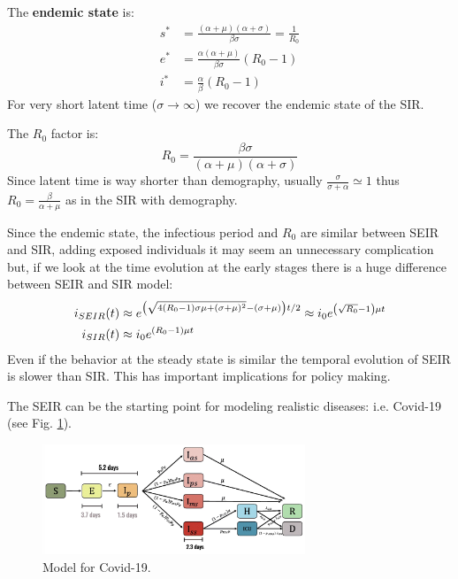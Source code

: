 \documentclass[../main/main.tex]{subfiles}
\begin{document}
The \textbf{endemic state} is:
\begin{equation}
\begin{split}
s^*  &=  \frac{(\alpha +\mu )(\alpha + \sigma )}{\beta \sigma } = \frac{1}{R_0} \\
e^* &= \frac{\alpha (\alpha +\mu )}{\beta \sigma } (R_0 -1)\\
i^* &= \frac{\alpha }{\beta } (R_0 -1)
\end{split}
\end{equation}
For very short latent time (\( \sigma \rightarrow \infty  \)) we recover the endemic state of the SIR.

The \( R_0 \) factor is:
\begin{equation}
  R_0 = \frac{\beta \sigma }{(\alpha + \mu )(\alpha +\sigma )}
\end{equation}
Since latent time is way shorter than demography, usually \( \frac{\sigma }{\sigma + \alpha } \simeq 1 \) thus \( R_0 = \frac{\beta }{\alpha + \mu } \) as in the SIR with demography.

Since the endemic state, the infectious period and $R_0$ are similar between SEIR and SIR, adding exposed individuals it may seem an unnecessary complication but, if we look at the time evolution at the early stages there is a huge difference between SEIR and SIR model:
\begin{equation}
\begin{split}
  i_{SEIR} (t) & \approx e^{\qty(\sqrt{4(R_0-1)\sigma \mu  + (\sigma + \mu )^2} -(\sigma +\mu ))t/2 } \approx i_0 e^{\qty(\sqrt{R_0} -1 ) \mu t} \\
    i_{SIR} (t) &\approx i_0 e^{(R_0-1) \mu t}
\end{split}
\end{equation}
Even if the behavior at the steady state is similar the temporal evolution of SEIR is slower than SIR. This has important implications for policy making.

The SEIR can be the starting point for modeling realistic diseases: i.e. Covid-19 (see Fig. \ref{fig:05_2}).

\begin{figure}[h!]
\centering
\includegraphics[width=0.7\textwidth]{../lessons/image/05/2.png}
\caption{\label{fig:05_2} Model for Covid-19.}
\end{figure}
\end{document}

